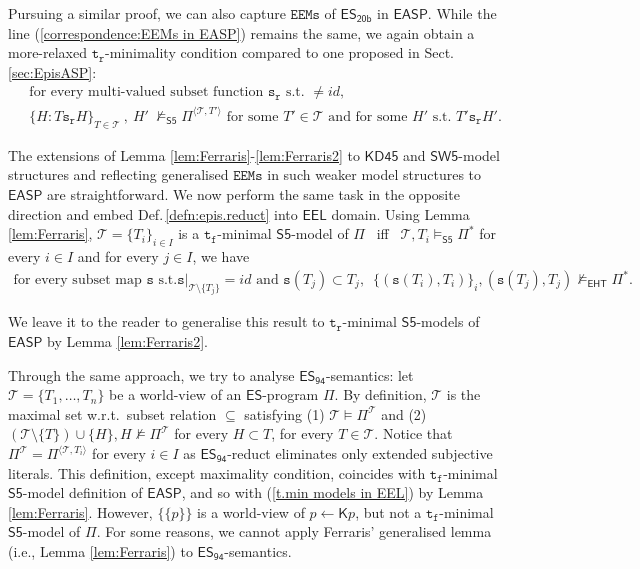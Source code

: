 \documentclass[submission,copyright,creativecommons]{eptcs}
\newcommand{\tuple}[1]  { \langle #1 \rangle }
\newcommand\restr[2]  { \ensuremath{\left.#1\right|_{#2}} }
\newcommand{\set}[1]  { \{ #1 \} }
\newcommand{\logic}[1]  { \ensuremath{\mathsf{#1}} }
\newcommand{\sfive}  { \logic{S5} }
\newcommand{\KD}  { \logic{KD45} }
\newcommand{\SW}  { \logic{SW5} }
\newcommand{\EHT}  { \logic{EHT} }
\newcommand{\ES}  { \logic{ES} }
\newcommand{\EASP}  { \logic{EASP} }
\newcommand{\EEL}  { \logic{EEL} }
\newcommand{\epispec}  { \Pi }
\newcommand{\K}  { \mathsf{K} }
\newcommand{\ESdoksandort}  { \logic{ES_{\scriptscriptstyle{94}} } }
\newcommand{\ESyirmib}  { \logic{ES_{\scriptscriptstyle{20b}} } }
\newcommand{\weak}  { \texttt{s} }
\newcommand{\functional}  { \texttt{f} }
\newcommand{\relational}  { \texttt{r} }
\newcommand{\weakrelational}  { \weak_{\!\relational} }
\newcommand{\tfunctional}  { \texttt{t}_{\!\functional} }
\newcommand{\trelational}  { \texttt{t}_{\!\relational} }
\newcommand{\EEMs}  { \texttt{EEMs} }
\newcommand{\notEhtmodels}  { \not\models_{\scriptscriptstyle \EHT} }
\newcommand{\sfivemodels}  { \models_{\scriptscriptstyle{\sfive}} }
\newcommand{\notsfivemodels}  { \not\models_{\scriptscriptstyle{\sfive}} }
\begin{document}
Pursuing a similar proof, we can also capture $\EEMs$ of $\ESyirmib$ in $\EASP$.
While the line (\ref{correspondence:EEMs in EASP}) remains the same, we again obtain a more-relaxed 
$\trelational$-minimality condition compared to one proposed in Sect.\,\ref{sec:EpisASP}:
%
\begin{align}\label{correspondence:foundedEEMs in EASP}
&\text{for every multi-valued subset function } \weakrelational \text{ s.t.\ } \neq id,
\nonumber 
\\
&\set{H : T\weakrelational H}_{\scriptscriptstyle{T\in \mathcal T}}~,~H'~\notsfivemodels \epispec^{\tuple{\mathcal T, T'}}
\text{ for some } T' \in \mathcal T 
\text{ and for some } H' \text{ s.t.\ } T' \weakrelational H'. 
\end{align}

The extensions of Lemma \ref{lem:Ferraris}-\ref{lem:Ferraris2} to
$\KD$ and $\SW$-model structures and 
reflecting generalised $\EEMs$ in such weaker model structures
to $\EASP$ are straightforward. 
We now perform the same task in the opposite direction and
embed Def.\,\ref{defn:epis.reduct} into $\EEL$
domain. Using Lemma \ref{lem:Ferraris}, $\mathcal T=\set{T_i}_{i\in I}$ is a $\tfunctional$-minimal $\sfive$-model of $\epispec$ \ iff \
$\mathcal T, T_i \sfivemodels \epispec^*$ for every $i \in I$  and for every $j \in I$,
we have
%
\begin{align}\label{t.min models in EEL}
\text{for every subset map } \weak \text{ s.t.} \restr{\weak}{\mathcal T\setminus \set{T_j}}=id 
\text{ and } \weak(T_j)\subset T_j,\,\,\,
\set{(\weak(T_i),T_i)}_{i}, (\weak(T_j),T_j)\notEhtmodels \epispec^*. 
\end{align}

We leave it to the reader to generalise this result to 
$\trelational$-minimal $\sfive$-models of $\EASP$
by Lemma \ref{lem:Ferraris2}.

Through the same approach, we try to analyse $\ESdoksandort$-semantics:
let $\mathcal T=\set{T_1, \ldots, T_n}$ be a 
world-view of an $\ES$-program $\epispec$. By definition, 
$\mathcal T$ is the maximal set w.r.t.\
subset relation $\subseteq$ satisfying 
(1) $\mathcal T \models \epispec^{\mathcal T}$ and 
(2) $(\mathcal T\setminus\set{T}) \cup\set{H}, H \not\models \epispec^{\mathcal T}$ 
for every $H \subset T$, for every $T \in \mathcal T$. 
Notice that $\epispec^{\mathcal T}=\epispec^{\tuple{\mathcal T,T_i}}$ for every $i \in I$ as $\ESdoksandort$-reduct eliminates only extended subjective literals. This definition, except maximality condition, coincides with $\tfunctional$-minimal $\sfive$-model definition of $\EASP$, and so with (\ref{t.min models in EEL}) by Lemma \ref{lem:Ferraris}. However,
$\set{\set p}$ is a world-view of $p \leftarrow \K p$, but not a $\tfunctional$-minimal $\sfive$-model of $\epispec$.
For some reasons, we cannot apply Ferraris' generalised lemma 
(i.e., Lemma \ref{lem:Ferraris}) to $\ESdoksandort$-semantics. 
\end{document}
